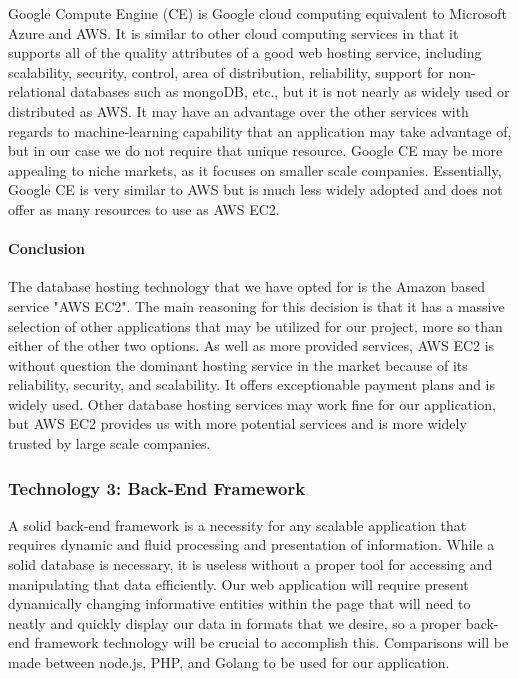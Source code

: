 		Google Compute Engine (CE) is Google cloud computing equivalent to Microsoft Azure and AWS. It is similar to other cloud computing services in that it supports all of 
		the quality attributes of a good web hosting service, including scalability, security, control, area of distribution, reliability, support for non-relational databases
		such as mongoDB, etc., but it is not nearly as widely used or distributed as AWS. It may have an advantage over the other services with regards to machine-learning capability that an application
		may take advantage of, but in our case we do not require that unique resource. Google CE may be more appealing to niche markets, as it focuses on smaller scale companies.
		Essentially, Google CE is very similar to AWS but is much less widely adopted and does not offer as many resources to use as AWS EC2.
		
	\paragraph{Conclusion}
	
		The database hosting technology that we have opted for is the Amazon based service "AWS EC2". The main reasoning for this decision is that it has a massive
		selection of other applications that may be utilized for our project, more so than either of the other two options. As well as more provided services, AWS EC2 is
		without question the dominant hosting service in the market because of its reliability, security, and scalability. It offers exceptionable payment plans and is
		widely used. Other database hosting services may work fine for our application, but AWS EC2 provides us with more potential services and is more widely trusted by large scale companies. 
	
	
\subsubsection{Technology 3: Back-End Framework}

	A solid back-end framework is a necessity for any scalable application that requires dynamic and fluid processing and presentation of information. While a solid
	database is necessary, it is useless without a proper tool for accessing and manipulating that data efficiently. Our  web application will require present dynamically 
	changing informative entities within the page that will need to neatly and quickly display our data in formats that we desire, so a proper back-end framework technology
	will be crucial to accomplish this. Comparisons will be made between node.js, PHP, and Golang to be used for our application.

